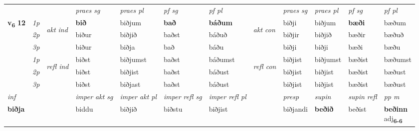 \begin{longtable}[l]{X>{\footnotesize\itshape}llXXXXlXXXX}
 & &   & \textit{praes sg}  & \textit{praes pl}    & \textit{ pf sg} & \textit{pf pl} & & \textit{praes sg}  & \textit{praes pl}    & \textit{pf sg} & \textit{pf pl }  \\ \cmidrule{4-7} \cmidrule{9-12}
 \multirow{2}{*}{{{\textbf{v{\textsubscript{6}}} \Large{\textbf{12}}}}}  & 1p & \multirow{3}{*}{\begin{turn}{90}\textit{akt ind}\end{turn}} & \textbf{bið} & biðjum & \textbf{bað} & \textbf{báðum} & \multirow{3}{*}{\begin{turn}{90}\textit{akt con}\end{turn}} &biðji & biðjum & \textbf{bæði} & bæðum\\*
 & 2p &  &  biður  & biðjið & baðst & báðuð & & biðjir & biðjið & bæðir & bæðuð \\*
 & 3p &  & biður & biðja & bað & báðu & & biðji & biðji& bæði & bæðu \\*
\cmidrule{4-7} \cmidrule{9-12}
 & 1p & \multirow{3}{*}{\begin{turn}{90}\textit{refl ind}\end{turn}}  & biðst & biðjumst & baðst & báðumst & \multirow{3}{*}{\begin{turn}{90}\textit{refl con}\end{turn}}  &biðjist & biðjumst & bæðist & bæðumst \\*
 & 2p &  & biðst & biðjist & baðst & báðust & &biðjist & biðjist & bæðist & bæðust \\*
 & 3p  & & biðst & biðjast & baðst & báðust & & biðjist & biðjist& bæðist & bæðust \\*
\cmidrule{4-7} \cmidrule{9-12}

   {\textit{inf}} & &  & \textit{imper akt sg} & \textit{imper akt pl} & \textit{imper refl sg} & \textit{imper refl pl} && \textit{presp} & \textit{supin} & \textit{supin refl} & \textit{pp m} \\*
  {\textbf{biðja}} & && biddu  & biðjið & biðstu & biðjist && biðjandi &  \textbf{beðið} & beðist & \specialcell{\textbf{beðinn} \\ adj\textbf{\textsubscript{6-6}}} \\*

\midrule


\end{longtable}

